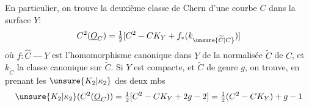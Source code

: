 
En particulier, on trouve la deuxième classe de Chern d'une courbe \(C\) dans la surface \(Y\):
\[
C^2(\underline O_C)=\tfrac12[C^2-CK_Y+f_*(k_{\unsure{\widetilde C|C}})]
\]
où \(f:\widehat C\mathbin{\text{---}}Y\) est l'homomorphisme canonique dans \(Y\) de la normalisée \(\widetilde C\) de \(C\), et \(k_{\widetilde C}\) la classe canonique sur \(\widetilde C\). Si \(Y\) est compacte, et \(\widetilde C\) de genre \(g\), on trouve, en prenant les \(\unsure{K_2|\kappa_2}\) des deux mbs
\[
\unsure{K_2|\kappa_2}(C^2(\underline O_C))=\tfrac12[C^2-CK_Y+2g-2]=\tfrac12(C^2-CK_Y)+g-1
\]

